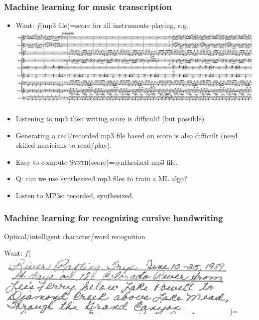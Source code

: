 \documentclass{beamer}
\begin{document}
\begin{frame}
  \frametitle{Machine learning for music transcription}

  \begin{itemize}
   \item Want: $f$(mp3 file)=score for all instruments playing, e.g.
\includegraphics[width=\textwidth]{music-transcription/BFD-page2}
\item Listening to mp3 then writing score is difficult! (but possible)
\item Generating a real/recorded mp3 file based on score is also difficult
  (need skilled musicians to read/play).
\item Easy to compute \textsc{Synth}(score)=synthesized mp3 file.
\item Q: can we use synthesized mp3 files to train a ML algo?
\item  Listen to MP3s: recorded, synthesized.
  \end{itemize}
\end{frame}

\begin{frame}
  \frametitle{Machine learning for recognizing cursive handwriting}

Optical/intelligent character/word recognition 

Want: $f$(\includegraphics[width=0.9\textwidth]{grandma-handwriting/grand-canyon-page1-paragraph1})=


\end{frame}
\end{document}

